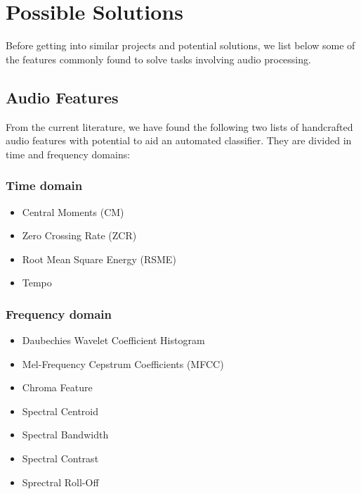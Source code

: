 \section{Possible Solutions}

Before getting into similar projects and potential solutions, we list below some of the features commonly found to solve tasks involving audio processing.

\subsection{Audio Features}

From the current literature, we have found the following two lists of handcrafted audio features with potential to aid an automated classifier. They are divided in time and frequency domains:


\subsubsection{Time domain}

\begin{itemize}
    \item Central Moments (CM)
    \item Zero Crossing Rate (ZCR)
    \item Root Mean Square Energy (RSME)
    \item Tempo
\end{itemize}

\subsubsection{Frequency domain}

\begin{itemize}
    \item Daubechies Wavelet Coefficient Histogram 
    \item Mel-Frequency Cepstrum Coefficients (MFCC)
    \item Chroma Feature
    \item Spectral Centroid
    \item Spectral Bandwidth
    \item Spectral Contrast
    \item Sprectral Roll-Off
\end{itemize}

